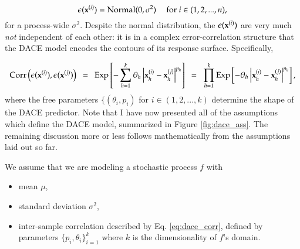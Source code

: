 \begin{equation} \label{eq:dace_err}
\epsilon(\mathbf{x}^{(i)}) = \text{Normal}(0,\sigma^2)\ \ \ \ \ \text{for } i \in (1,2,...,n),
\end{equation}
for a process-wide $\sigma^2$. Despite the normal distribution, the $\epsilon(\mathbf{x}^{(i)})$ are very much \emph{not} independent of each other: it is in a complex error-correlation structure that the DACE model encodes the contours of its response surface. Specifically,

\begin{equation} \label{eq:dace_corr}
\text{Corr}\left(\epsilon(\X^{(i)}),\epsilon(\X^{(j)})\right)\ \  = \ \ 
	\text{Exp}
		\left [ 
			-\sum_{h=1}^{k} 
				\theta_h \left | \X^{(i)}_h - \X^{(j)}_h \right | ^{p_h}
		\right ]\ \  = \ \ 
	\prod_{h=1}^{k}
		\text{Exp}
			\left [
				-\theta_h \left | \X^{(i)}_h - \X^{(j)}_h \right | ^{p_h}
			\right ],
\end{equation}
where the free parameters $\{(\theta_i,p_i)$ for $i \in (1,2,...,k)$ determine the shape of the DACE predictor. Note that I have now presented all of the assumptions which define the DACE model, summarized in Figure \ref{fig:dace_ass}. The remaining discussion more or less follows mathematically from the assumptions laid out so far.

\begin{minipage}{\textwidth}
\begin{framed}
We assume that we are modeling a stochastic process $f$ with
\begin{itemize}
\item mean $\mu$,
\item standard deviation $\sigma^2$,
\item inter-sample correlation described by Eq. \ref{eq:dace_corr}, defined by parameters $\{p_i,\theta_i\}_{i=1}^k$ where $k$ is the dimensionality of $f$'s domain. 
\end{itemize}


\end{framed}
\label{fig:dace_ass}
\end{minipage}


